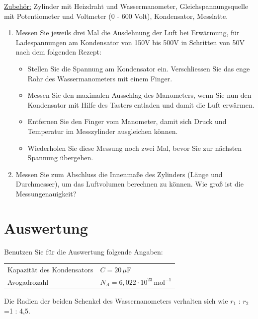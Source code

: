 \underline{Zubehör:} Zylinder mit Heizdraht und Wassermanometer, Gleichspannungsquelle mit Potentiometer und Voltmeter (0 - 600 Volt), Kondensator, Messlatte.

\begin{enumerate}
 \item Messen Sie jeweils drei Mal die Ausdehnung der Luft bei Erwärmung, für Ladespannungen am Kondensator von 150\;V bis 500\;V in Schritten von 50\;V nach dem folgenden Rezept: 
  \begin{itemize}
	 \item Stellen Sie die Spannung am Kondensator ein. Verschliessen Sie das enge Rohr des Wassermanometers mit einem Finger.
	 \item Messen Sie den maximalen Ausschlag des Manometers, wenn Sie nun den Kondensator mit Hilfe des Tasters entladen und damit die Luft erwärmen.
	 \item Entfernen Sie den Finger vom Manometer, damit sich Druck und Temperatur im Messzylinder ausgleichen können.
	 \item Wiederholen Sie diese Messung noch zwei Mal, bevor Sie zur nächsten Spannung übergehen.
	\end{itemize}
 \item Messen Sie zum Abschluss die Innenmaße des Zylinders (Länge und Durchmesser), um das Luftvolumen berechnen zu können. Wie groß ist die Messungenauigkeit?
\end{enumerate}

\section{Auswertung} 

Benutzen Sie für die Auswertung folgende Angaben:
\begin{table}[h]
		\begin{tabular}{ll}
			Kapazität des Kondensators & $C = 20\,\mu$F \\
			Avogadrozahl & $N_A = 6,022\cdot 10^{23}\,\mathrm{mol}^{-1}$
		\end{tabular}
\end{table}

\noindent
Die Radien der beiden Schenkel des Wassernanometers verhalten sich wie $r_1$ : $r_2$ =1 : 4,5.

